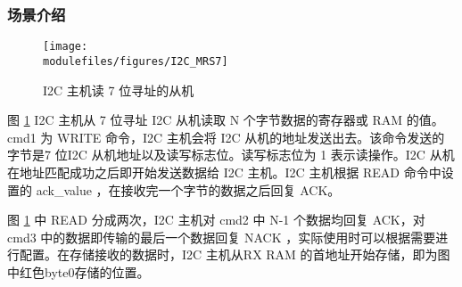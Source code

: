 \documentclass[main\_\_CN.tex]{subfiles}
\begin{document}
\subsubsection{场景介绍}
\begin{figure}[H]
    \centering
    \texttt{[image: \\modulefiles/figures/I2C\_MRS7]}
    \caption{I2C 主机读 7 位寻址的从机}
    \label{fig:i2c-mrs7}
\end{figure}

图 \ref{fig:i2c-mrs7} I2C 主机从 7 位寻址 I2C 从机读取 N 个字节数据的寄存器或 RAM 的值。cmd1 为 WRITE 命令，I2C 主机会将 I2C 从机的地址发送出去。该命令发送的字节是7 位I2C 从机地址以及读写标志位。读写标志位为 1 表示读操作。I2C 从机在地址匹配成功之后即开始发送数据给 I2C 主机。I2C 主机根据 READ 命令中设置的 ack\_value ，在接收完一个字节的数据之后回复 ACK。

图 \ref{fig:i2c-mrs7} 中 READ 分成两次，I2C 主机对 cmd2 中 N-1 个数据均回复 ACK，对 cmd3 中的数据即传输的最后一个数据回复 NACK ，实际使用时可以根据需要进行配置。在存储接收的数据时，I2C 主机从RX RAM 的首地址开始存储，即为图中红色byte0存储的位置。
\end{document}
